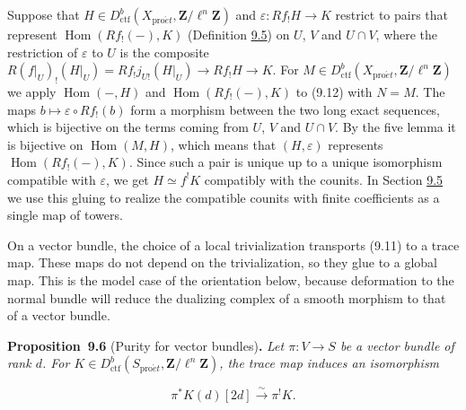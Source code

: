 \documentclass[11pt]{article}
\newenvironment{bpstatement}[2]{\par\addvspace{0.6\baselineskip}\noindent\textbf{#1}#2\textbf{.}\enspace\ignorespaces}
  {\par\addvspace{0.4\baselineskip}}
\newenvironment{bpstatementit}[2]{\begin{bpstatement}{#1}{#2}\itshape\ignorespaces}{\end{bpstatement}}
\begin{document}
Suppose that \(H\in D^b_{\mathrm{ctf}}(X_{\mathrm{pro}\acute{e}t},\mathbf Z/\ell^n\mathbf Z)\) and \(\varepsilon:Rf_!H\to K\) restrict to pairs that represent \(\operatorname{Hom}(Rf_!(-),K)\) (Definition \hyperref[bp19]{9.5}) on \(U\), \(V\) and \(U\cap V\), where the restriction of \(\varepsilon\) to \(U\) is the composite \(R(f|_U)_!(H|_U)=Rf_!j_{U!}(H|_U)\to Rf_!H\to K\). For \(M\in D^b_{\mathrm{ctf}}(X_{\mathrm{pro}\acute{e}t},\mathbf Z/\ell^n\mathbf Z)\) we apply \(\operatorname{Hom}(-,H)\) and \(\operatorname{Hom}(Rf_!(-),K)\) to (9.12) with \(N=M\). The maps \(b\mapsto\varepsilon\circ Rf_!(b)\) form a morphism between the two long exact sequences, which is bijective on the terms coming from \(U\), \(V\) and \(U\cap V\). By the five lemma it is bijective on \(\operatorname{Hom}(M,H)\), which means that \((H,\varepsilon)\) represents \(\operatorname{Hom}(Rf_!(-),K)\). Since such a pair is unique up to a unique isomorphism compatible with \(\varepsilon\), we get \(H\simeq f^!K\) compatibly with the counits. In Section \hyperref[bp41]{9.5} we use this gluing to realize the compatible counits with finite coefficients as a single map of towers.

On a vector bundle, the choice of a local trivialization transports (9.11) to a trace map. These maps do not depend on the trivialization, so they glue to a global map. This is the model case of the orientation below, because deformation to the normal bundle will reduce the dualizing complex of a smooth morphism to that of a vector bundle.

\label{bp21}%
\begin{bpstatementit}{Proposition~9.6}{ (Purity for vector bundles)}
Let \(\pi:V\to S\) be a vector bundle of rank \(d\). For \(K\in D^b_{\mathrm{ctf}}(S_{\mathrm{pro}\acute{e}t},\mathbf Z/\ell^n\mathbf Z)\), the trace map induces an isomorphism

\[
\pi^{*}K(d)[2d]\xrightarrow{\sim}\pi^{!}K.
\]
\end{bpstatementit}
\end{document}

